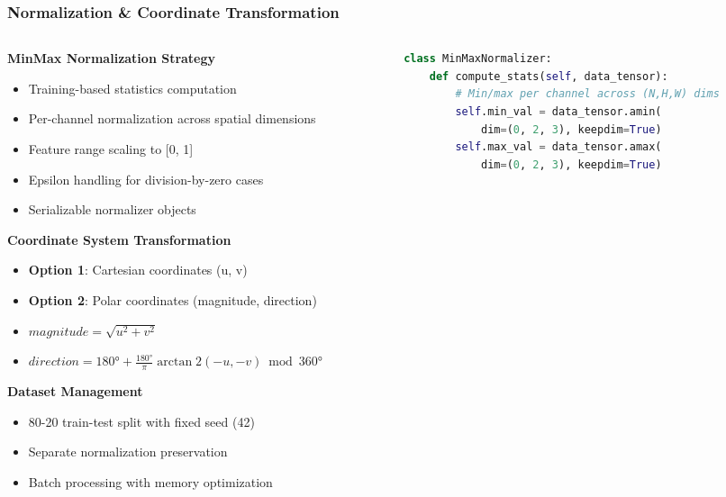\documentclass[footline=authortitle]{beamer}
\begin{document}
\begin{frame}[fragile]
\frametitle{Normalization \& Coordinate Transformation}
\tiny
\begin{columns}
\begin{column}{0.4\textwidth}
\textbf{MinMax Normalization Strategy}
\begin{itemize}
    \item Training-based statistics computation
    \item Per-channel normalization across spatial dimensions
    \item Feature range scaling to [0, 1]
    \item Epsilon handling for division-by-zero cases
    \item Serializable normalizer objects
\end{itemize}

\vspace{0.3cm}

\textbf{Coordinate System Transformation}
\begin{itemize}
    \item \textbf{Option 1}: Cartesian coordinates (u, v)
    \item \textbf{Option 2}: Polar coordinates (magnitude, direction)
    \item $magnitude = \sqrt{u^2 + v^2}$
    \item $direction = 180° + \frac{180°}{\pi} \arctan2(-u, -v) \bmod 360°$
\end{itemize}

\vspace{0.3cm}

\textbf{Dataset Management}
\begin{itemize}
    \item 80-20 train-test split with fixed seed (42)
    \item Separate normalization preservation
    \item Batch processing with memory optimization
\end{itemize}
\end{column}

\begin{column}{0.6\textwidth}

\begin{lstlisting}[language=Python, basicstyle=\ttfamily\tiny]
class MinMaxNormalizer:
    def compute_stats(self, data_tensor):
        # Min/max per channel across (N,H,W) dims
        self.min_val = data_tensor.amin(
            dim=(0, 2, 3), keepdim=True)
        self.max_val = data_tensor.amax(
            dim=(0, 2, 3), keepdim=True)
        

\end{lstlisting}
\end{column}
\end{columns}
\end{frame}
\end{document}
